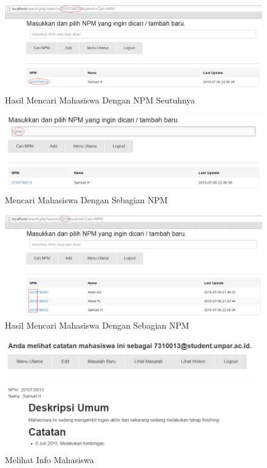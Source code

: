 \begin{figure}[H]
\centering
\includegraphics[scale=0.44]{Gambar/pengujian10.png}
\caption[Hasil Mencari Mahasiswa Dengan NPM Seutuhnya]{Hasil Mencari Mahasiswa Dengan NPM Seutuhnya}
\label{fig:hasilmencarinpmutuh}
\end{figure}

\begin{figure}[H]
\centering
\includegraphics[scale=0.44]{Gambar/pengujian11.png}
\caption[Mencari Mahasiswa Dengan Sebagian NPM]{Mencari Mahasiswa Dengan Sebagian NPM} 
\label{fig:mencarinpmsebagian}
\end{figure}

\begin{figure}[H]
\centering
\includegraphics[scale=0.44]{Gambar/pengujian12.png}
\caption[Hasil Mencari Mahasiswa Dengan Sebagian NPM]{Hasil Mencari Mahasiswa Dengan Sebagian NPM}
\label{fig:hasilmencarinpmsebagian}
\end{figure}

\begin{figure}[H]
\centering
\includegraphics[scale=0.44]{Gambar/pengujian13.png}
\caption[Melihat Info Mahasiswa]{Melihat Info Mahasiswa} 
\label{fig:melihatinfomahasiswa}
\end{figure}

